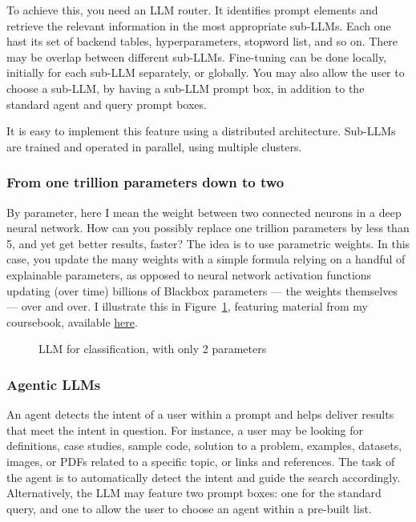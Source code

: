 \documentclass[10pt]{article}
\begin{document}
{To achieve this, you need an \textcolor{index}{LLM router}. It identifies prompt elements and retrieve the relevant information in the most appropriate sub-LLMs. Each one hast its set of backend tables, hyperparameters, stopword list, and so on. There may be overlap between different sub-LLMs. \textcolor{index}{Fine-tuning} can be done locally, initially for each sub-LLM separately, or globally. You may also allow the user to choose a sub-LLM, by having a sub-LLM prompt box, in addition to the standard agent and query prompt boxes.

It is easy to implement this feature using a \textcolor{index}{distributed architecture}.
Sub-LLMs are trained and operated in parallel, using multiple clusters. 





\subsubsection{From one trillion parameters down to two}\label{sedi7sn}
By parameter, here I mean the weight between two connected neurons in a deep neural network. How can you possibly replace one trillion parameters by less than 5, and yet get better results, faster? The idea is to use parametric weights. In this case, you update the many weights with a simple formula relying on a handful of explainable parameters, as opposed to neural network activation functions updating (over time) billions of Blackbox parameters — the weights themselves — over and over. I illustrate this in Figure~\ref{fig:greg097-ovv}, featuring material from my coursebook, available 
\href{https://mltechniques.com/product/ebook-state-of-the-art-in-genai-llms-creative-projects-with-solutions/}{here}.

\begin{figure}[H]
\centering
{}    
\caption{LLM for classification, with only 2 parameters}
\label{fig:greg097-ovv}
\end{figure}


\subsubsection{Agentic LLMs}
An \textcolor{index}{agent} detects the intent of a user within a prompt and helps deliver results that meet the intent in question. For instance, a user may be looking for definitions, case studies, sample code, solution to a problem, examples, datasets, images, or PDFs related to a specific topic, or links and references. The task of the agent is to automatically detect the intent and guide the search accordingly. Alternatively, the LLM may feature two prompt boxes: one for the standard query, and one to allow the user to choose an agent within a pre-built list.

}
\end{document}
